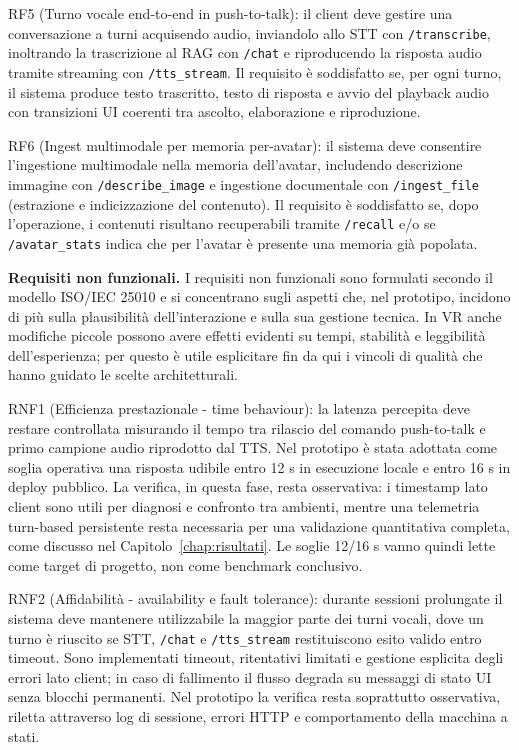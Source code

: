 RF5 (Turno vocale end-to-end in push-to-talk): il client deve gestire una conversazione a turni acquisendo audio, inviandolo allo STT con \texttt{/transcribe}, inoltrando la trascrizione al RAG con \texttt{/chat} e riproducendo la risposta audio tramite streaming con \texttt{/tts\_stream}. Il requisito è soddisfatto se, per ogni turno, il sistema produce testo trascritto, testo di risposta e avvio del playback audio con transizioni UI coerenti tra ascolto, elaborazione e riproduzione.

RF6 (Ingest multimodale per memoria per-avatar): il sistema deve consentire l'ingestione multimodale nella memoria dell'avatar, includendo descrizione immagine con \texttt{/describe\_image} e ingestione documentale con \texttt{/ingest\_file} (estrazione e indicizzazione del contenuto). Il requisito è soddisfatto se, dopo l'operazione, i contenuti risultano recuperabili tramite \texttt{/recall} e/o se \texttt{/avatar\_stats} indica che per l'avatar è presente una memoria già popolata.

\textbf{Requisiti non funzionali.} I requisiti non funzionali sono formulati secondo il modello ISO/IEC 25010 e si concentrano sugli aspetti che, nel prototipo, incidono di più sulla plausibilità dell'interazione e sulla sua gestione tecnica. In VR anche modifiche piccole possono avere effetti evidenti su tempi, stabilità e leggibilità dell'esperienza; per questo è utile esplicitare fin da qui i vincoli di qualità che hanno guidato le scelte architetturali.\cite{Karre2024VReqST}

RNF1 (Efficienza prestazionale - time behaviour): la latenza percepita deve restare controllata misurando il tempo tra rilascio del comando push-to-talk e primo campione audio riprodotto dal TTS. Nel prototipo è stata adottata come soglia operativa una risposta udibile entro 12 s in esecuzione locale e entro 16 s in deploy pubblico. La verifica, in questa fase, resta osservativa: i timestamp lato client sono utili per diagnosi e confronto tra ambienti, mentre una telemetria turn-based persistente resta necessaria per una validazione quantitativa completa, come discusso nel Capitolo~\ref{chap:risultati}. Le soglie 12/16 s vanno quindi lette come target di progetto, non come benchmark conclusivo.\cite{Lin2024Estuary}

RNF2 (Affidabilità - availability e fault tolerance): durante sessioni prolungate il sistema deve mantenere utilizzabile la maggior parte dei turni vocali, dove un turno è riuscito se STT, \texttt{/chat} e \texttt{/tts\_stream} restituiscono esito valido entro timeout. Sono implementati timeout, ritentativi limitati e gestione esplicita degli errori lato client; in caso di fallimento il flusso degrada su messaggi di stato UI senza blocchi permanenti. Nel prototipo la verifica resta soprattutto osservativa, riletta attraverso log di sessione, errori HTTP e comportamento della macchina a stati.

